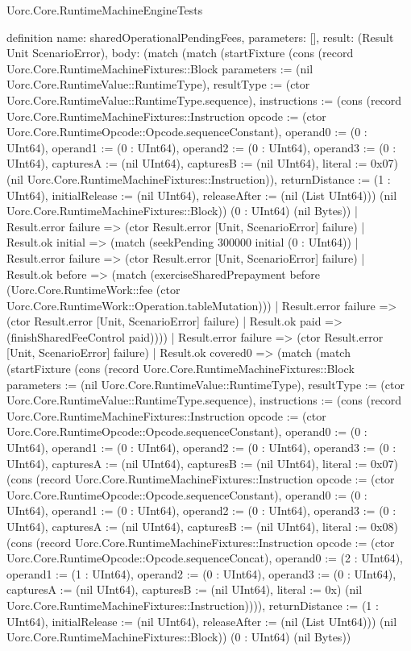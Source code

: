 \begin{lexlean}{Uorc.Core.RuntimeMachineEngineTests}
\begin{semanticmodule}
definition{
  name: sharedOperationalPendingFees,
  parameters: [],
  result: (Result Unit ScenarioError),
  body: (match (match (startFixture (cons (record Uorc.Core.RuntimeMachineFixtures::Block {parameters := (nil Uorc.Core.RuntimeValue::RuntimeType), resultType := (ctor Uorc.Core.RuntimeValue::RuntimeType.sequence), instructions := (cons (record Uorc.Core.RuntimeMachineFixtures::Instruction {opcode := (ctor Uorc.Core.RuntimeOpcode::Opcode.sequenceConstant), operand0 := (0 : UInt64), operand1 := (0 : UInt64), operand2 := (0 : UInt64), operand3 := (0 : UInt64), capturesA := (nil UInt64), capturesB := (nil UInt64), literal := 0x07}) (nil Uorc.Core.RuntimeMachineFixtures::Instruction)), returnDistance := (1 : UInt64), initialRelease := (nil UInt64), releaseAfter := (nil (List UInt64))}) (nil Uorc.Core.RuntimeMachineFixtures::Block)) (0 : UInt64) (nil Bytes))
      | Result.error failure => (ctor Result.error [Unit, ScenarioError] failure)
      | Result.ok initial => (match (seekPending 300000 initial (0 : UInt64))
        | Result.error failure => (ctor Result.error [Unit, ScenarioError] failure)
        | Result.ok before => (match (exerciseSharedPrepayment before (Uorc.Core.RuntimeWork::fee (ctor Uorc.Core.RuntimeWork::Operation.tableMutation)))
          | Result.error failure => (ctor Result.error [Unit, ScenarioError] failure)
          | Result.ok paid => (finishSharedFeeControl paid))))
    | Result.error failure => (ctor Result.error [Unit, ScenarioError] failure)
    | Result.ok covered0 => (match (match (startFixture (cons (record Uorc.Core.RuntimeMachineFixtures::Block {parameters := (nil Uorc.Core.RuntimeValue::RuntimeType), resultType := (ctor Uorc.Core.RuntimeValue::RuntimeType.sequence), instructions := (cons (record Uorc.Core.RuntimeMachineFixtures::Instruction {opcode := (ctor Uorc.Core.RuntimeOpcode::Opcode.sequenceConstant), operand0 := (0 : UInt64), operand1 := (0 : UInt64), operand2 := (0 : UInt64), operand3 := (0 : UInt64), capturesA := (nil UInt64), capturesB := (nil UInt64), literal := 0x07}) (cons (record Uorc.Core.RuntimeMachineFixtures::Instruction {opcode := (ctor Uorc.Core.RuntimeOpcode::Opcode.sequenceConstant), operand0 := (0 : UInt64), operand1 := (0 : UInt64), operand2 := (0 : UInt64), operand3 := (0 : UInt64), capturesA := (nil UInt64), capturesB := (nil UInt64), literal := 0x08}) (cons (record Uorc.Core.RuntimeMachineFixtures::Instruction {opcode := (ctor Uorc.Core.RuntimeOpcode::Opcode.sequenceConcat), operand0 := (2 : UInt64), operand1 := (1 : UInt64), operand2 := (0 : UInt64), operand3 := (0 : UInt64), capturesA := (nil UInt64), capturesB := (nil UInt64), literal := 0x}) (nil Uorc.Core.RuntimeMachineFixtures::Instruction)))), returnDistance := (1 : UInt64), initialRelease := (nil UInt64), releaseAfter := (nil (List UInt64))}) (nil Uorc.Core.RuntimeMachineFixtures::Block)) (0 : UInt64) (nil Bytes))
}
\end{semanticmodule}
\end{lexlean}
